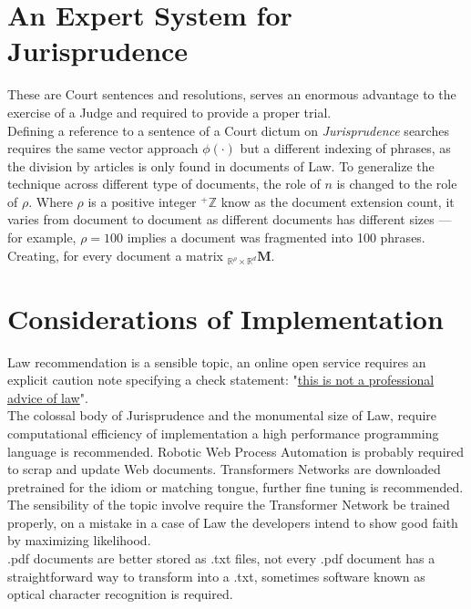 \documentclass[a4paper,fleqn]{cas-sc}
\begin{document}
\section{An Expert System for Jurisprudence}
These are Court sentences and resolutions, serves an enormous advantage to the exercise of a Judge and required to provide a 
proper trial. \\
\noindent
Defining a reference to a sentence of a Court dictum on \textit{Jurisprudence} searches requires the same vector approach $\phi(\cdot)$ 
but a different indexing of phrases, as the division by articles is only found in documents of Law. To generalize 
the technique across different type of documents, the role of $n$ is changed to the role of $\rho$. Where $\rho$ is a positive integer 
${}^{+}\mathbb{Z}$ know as the document extension count, it varies from document to document as different documents has different sizes ---
for example, $\rho=100$ implies a document was fragmented into 100 phrases. Creating, 
for every document a matrix ${}_{\mathbb{R}^{\rho}\times\mathbb{R}^{d}}{\mathbf{M}}$.\\

\section{Considerations of Implementation}
Law recommendation is a sensible topic, an online open service requires an explicit caution note specifying a check statement: 
"\color{red}\underline{this is not a professional advice of law}\color{black}". \\

The colossal body of Jurisprudence 
and the monumental size of Law, require computational efficiency of implementation a high performance programming language is 
recommended. Robotic Web Process Automation is probably required to scrap and update Web documents. 
Transformers Networks are downloaded pretrained for the idiom or matching tongue, further fine tuning is recommended. \\
The sensibility of the topic involve require the Transformer Network be trained properly, 
on a mistake in a case of Law the developers intend to show good faith by maximizing likelihood. \\
.pdf documents are better stored as .txt files, not every .pdf document has a straightforward way to 
transform into a .txt, sometimes software known as optical character recognition is required. \\
\end{document}
